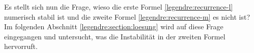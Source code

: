 
Es stellt sich nun die Frage, wieso die erste Formel \eqref{legendre:recurrence-l} numerisch stabil ist und die zweite Formel \eqref{legendre:recurrence-m} es nicht ist?
Im folgenden Abschnitt \ref{legendre:section:loesung} wird auf diese Frage eingegangen und untersucht, was die Instabilität in der zweiten Formel hervorruft.